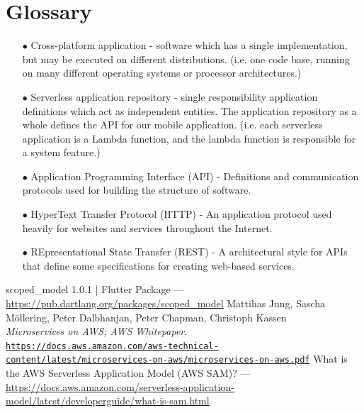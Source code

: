 \documentclass[10pt, a4paper]{article}
\begin{document}
\section{Glossary}
\begin{enumerate}
	\item[$\bullet$] Cross-platform application - software which has a single implementation, but may be executed on different distributions. (i.e. one code base, running on many different operating systems or processor architectures.)
	\item[$\bullet$] Serverless application repository - single responsibility application definitions which act as independent entities. The application repository as a whole defines the API for our mobile application. (i.e. each serverless application is a Lambda function, and the lambda function is responsible for a system feature.)
	\item[$\bullet$] Application Programming Interface (API) - Definitions and communication protocols used for building the structure of software.
	\item[$\bullet$] HyperText Transfer Protocol (HTTP) - An application protocol used heavily for websites and services throughout the Internet.
	\item[$\bullet$] REpresentational State Transfer (REST) - A architectural style for APIs that define some specifications for creating web-based services.
\end{enumerate}

\begin{thebibliography}{9}
scoped\_model 1.0.1 | Flutter Package --- \url{https://pub.dartlang.org/packages/scoped_model}
		Mattihas Jung, Sascha Möllering, Peter Dalbhanjan, Peter Chapman, Christoph Kassen \\
		\textit{Microservices on AWS; AWS Whitepaper}. \\
		\texttt{\url{https://docs.aws.amazon.com/aws-technical-content/latest/microservices-on-aws/microservices-on-aws.pdf}}
What is the AWS Serverless Application Model (AWS SAM)? --- \url{https://docs.aws.amazon.com/serverless-application-model/latest/developerguide/what-is-sam.html}
\end{thebibliography}

\begin{appendix}
	\listoffigures
\end{appendix}
\end{document}
